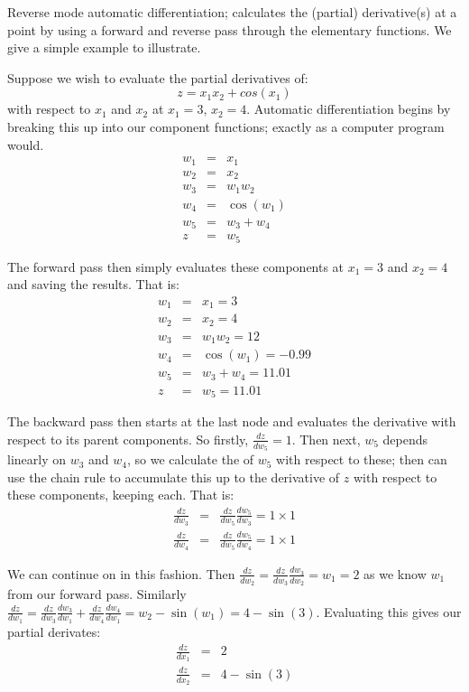 Reverse mode automatic differentiation; calculates the (partial) derivative(s) at a point by using a forward and reverse pass through the elementary functions.
We give a simple example to illustrate.

Suppose we wish to evaluate the partial derivatives of:
\begin{equation}
	z = x_1 x_2 + cos(x_1)
\end{equation}
with respect to $x_1$ and $x_2$ at $x_1=3$, $x_2=4$.
Automatic differentiation begins by breaking this up into our component functions; exactly as a computer program would. 
\begin{eqnarray*}
	w_1 &=& x_1 \\
	w_2 &=& x_2 \\
	w_3 &=& w_1 w_2 \\
	w_4 &=& \cos\left(w_1\right) \\
	w_5 &=& w_3 + w_4 \\
	z &=& w_5
\end{eqnarray*}

The forward pass then simply evaluates these components at $x_1=3$ and $x_2=4$ and saving the results.
That is: 
\begin{eqnarray*}
	w_1 &=& x_1 = 3 \\
	w_2 &=& x_2 = 4\\
	w_3 &=& w_1 w_2 = 12 \\
	w_4 &=& \cos\left(w_1\right) = -0.99 \\
	w_5 &=& w_3 + w_4  = 11.01\\
	z &=& w_5 = 11.01
\end{eqnarray*}

The backward pass then starts at the last node and evaluates the derivative with respect to its parent components.
So firstly, $\frac{dz}{dw_5} = 1$.
Then next, $w_5$ depends linearly on $w_3$ and $w_4$, so we calculate the of $w_5$ with respect to these; then can use the chain rule to accumulate this up to the derivative of $z$ with respect to these components, keeping each. 
That is:
\begin{eqnarray*}
	\frac{dz}{dw_3} &=& \frac{dz}{dw_5}\frac{dw_5}{dw_3} = 1 \times 1 \\
	\frac{dz}{dw_4} &=& \frac{dz}{dw_5}\frac{dw_5}{dw_4} = 1 \times 1
\end{eqnarray*}

We can continue on in this fashion.
Then $\frac{dz}{dw_2} = \frac{dz}{dw_3}\frac{dw_3}{dw_2} = w_1 = 2$ as we know $w_1$ from our forward pass.
Similarly $\frac{dz}{dw_1} = \frac{dz}{dw_3}\frac{dw_3}{dw_1} +  \frac{dz}{dw_4}\frac{dw_4}{dw_1}= w_2 - \sin(w_1)= 4 - \sin(3)$.
Evaluating this gives our partial derivates:
\begin{eqnarray*}
	\frac{dz}{dx_1} &=& 2 \\
	\frac{dz}{dx_2} &=& 4 - \sin(3)
\end{eqnarray*}

